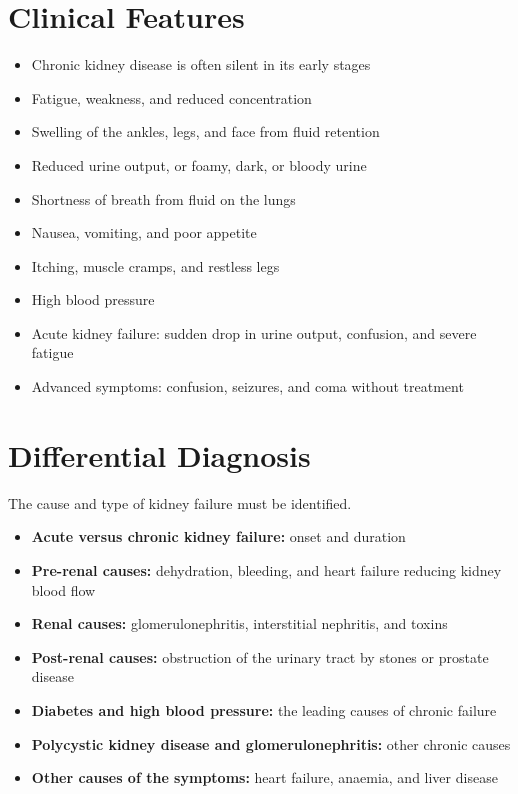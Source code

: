 \section*{Clinical Features}
\begin{itemize}
    \item Chronic kidney disease is often silent in its early stages
    \item Fatigue, weakness, and reduced concentration
    \item Swelling of the ankles, legs, and face from fluid retention
    \item Reduced urine output, or foamy, dark, or bloody urine
    \item Shortness of breath from fluid on the lungs
    \item Nausea, vomiting, and poor appetite
    \item Itching, muscle cramps, and restless legs
    \item High blood pressure
    \item Acute kidney failure: sudden drop in urine output, confusion, and severe fatigue
    \item Advanced symptoms: confusion, seizures, and coma without treatment
\end{itemize}

\section*{Differential Diagnosis}
The cause and type of kidney failure must be identified.
\begin{itemize}
    \item \textbf{Acute versus chronic kidney failure:} onset and duration
    \item \textbf{Pre-renal causes:} dehydration, bleeding, and heart failure reducing kidney blood flow
    \item \textbf{Renal causes:} glomerulonephritis, interstitial nephritis, and toxins
    \item \textbf{Post-renal causes:} obstruction of the urinary tract by stones or prostate disease
    \item \textbf{Diabetes and high blood pressure:} the leading causes of chronic failure
    \item \textbf{Polycystic kidney disease and glomerulonephritis:} other chronic causes
    \item \textbf{Other causes of the symptoms:} heart failure, anaemia, and liver disease
\end{itemize}

